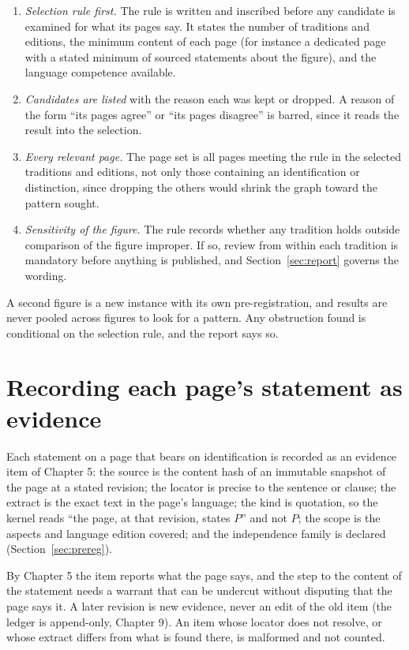 \documentclass[11pt]{article}
\begin{document}
\begin{enumerate}[label=(S\arabic*),nosep]
\item \emph{Selection rule first.} The rule is written and inscribed before any candidate is examined for what its pages say. It states the number of traditions and editions, the minimum content of each page (for instance a dedicated page with a stated minimum of sourced statements about the figure), and the language competence available.
\item \emph{Candidates are listed} with the reason each was kept or dropped. A reason of the form ``its pages agree'' or ``its pages disagree'' is barred, since it reads the result into the selection.
\item \emph{Every relevant page.} The page set is all pages meeting the rule in the selected traditions and editions, not only those containing an identification or distinction, since dropping the others would shrink the graph toward the pattern sought.
\item \emph{Sensitivity of the figure.} The rule records whether any tradition holds outside comparison of the figure improper. If so, review from within each tradition is mandatory before anything is published, and Section~\ref{sec:report} governs the wording.
\end{enumerate}

A second figure is a new instance with its own pre-registration, and results are never pooled across figures to look for a pattern. Any obstruction found is conditional on the selection rule, and the report says so.

\section{Recording each page's statement as evidence}\label{sec:evidence}

Each statement on a page that bears on identification is recorded as an evidence item of Chapter 5: the source is the content hash of an immutable snapshot of the page at a stated revision; the locator is precise to the sentence or clause; the extract is the exact text in the page's language; the kind is quotation, so the kernel reads ``the page, at that revision, states $P$'' and not $P$; the scope is the aspects and language edition covered; and the independence family is declared (Section~\ref{sec:prereg}).

By Chapter 5 the item reports what the page says, and the step to the content of the statement needs a warrant that can be undercut without disputing that the page says it. A later revision is new evidence, never an edit of the old item (the ledger is append-only, Chapter 9). An item whose locator does not resolve, or whose extract differs from what is found there, is malformed and not counted.
\end{document}
